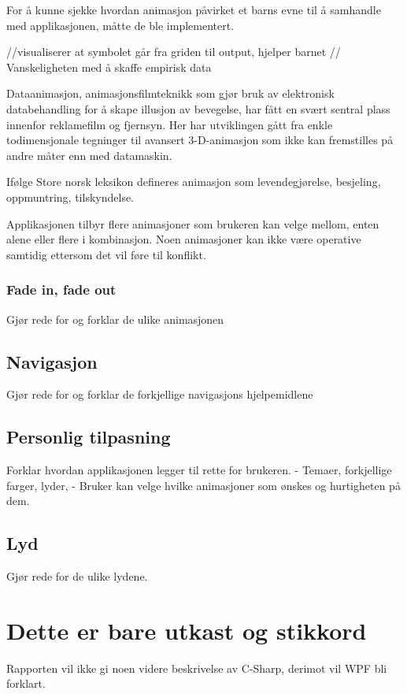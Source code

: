 For å kunne sjekke hvordan animasjon påvirket et barns evne til å samhandle med applikasjonen, måtte de ble implementert.  

//visualiserer at symbolet går fra griden til output, hjelper barnet
// Vanskeligheten med å skaffe empirisk data


Dataanimasjon, animasjonsfilmteknikk som gjør bruk av elektronisk databehandling for å skape illusjon av bevegelse, har fått en svært sentral plass innenfor reklamefilm og fjernsyn. Her har utviklingen gått fra enkle todimensjonale tegninger til avansert 3-D-animasjon som ikke kan fremstilles på andre måter enn med datamaskin.

Ifølge Store norsk leksikon defineres animasjon som levendegjørelse, besjeling, oppmuntring, tilskyndelse. 


Applikasjonen tilbyr flere animasjoner som brukeren kan velge mellom, enten alene eller flere i kombinasjon. Noen animasjoner kan ikke være operative samtidig ettersom det vil føre til konflikt. 

\subsection{Fade in, fade out}

Gjør rede for og forklar de ulike animasjonen

\section{Navigasjon}
Gjør rede for og forklar de forkjellige navigasjons hjelpemidlene

\section{Personlig tilpasning}
Forklar hvordan applikasjonen legger til rette for brukeren.
    - Temaer, forkjellige farger, lyder, 
    - Bruker kan velge hvilke animasjoner som ønskes og hurtigheten på dem.
    
\section{Lyd}
    Gjør rede for de ulike lydene.

\chapter{Dette er bare utkast og stikkord}

Rapporten vil ikke gi noen videre beskrivelse av C-Sharp, derimot vil WPF bli forklart.


